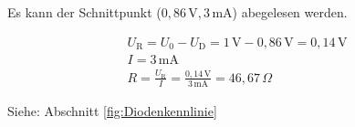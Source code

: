 {\begin{itemize}
        Es kann der Schnittpunkt ($0,86\,\mathrm{V}, 3\,\mathrm{mA}$) abegelesen werden.
    
        \begin{gather*}
            U_\mathrm{R} = U_0 - U_\mathrm{D} = 1 \, \mathrm{V} - 0,86 \, \mathrm{V} = 0,14 \, \mathrm{V} \\
            I = 3 \, \mathrm{mA} \\
            R = \frac{U_{\text{R}}}{I} = \frac{0,14 \, \text{V}}{3 \, \text{mA}} = 46,67 \, \Omega
        \end{gather*}
    \end{itemize}
Siehe: Abschnitt \ref{fig:Diodenkennlinie}









}
